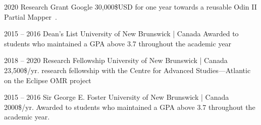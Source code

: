 \documentclass{developercv} %
\begin{document}

\begin{entrylist}

	\entry
	{2020}
	{Research Grant}
	{Google}
	{30,000\$USD for one year towards a reusable Odin II Partial Mapper~\footnotemark.}

	\entry
	{2015 -- 2016}
	{Dean's List}
	{University of New Brunswick | Canada}
	{Awarded to students who maintained a GPA above 3.7 throughout the academic year}

\end{entrylist}



\begin{entrylist}

	\entry
	{2018 -- 2020}
	{Research Fellowship}
	{University of New Brunswick | Canada}
	{23,500\$/yr. research fellowship  with the Centre for Advanced Studies---Atlantic on the Eclipse OMR project}

	\entry
	{2015 -- 2016}
	{Sir George E. Foster}
	{University of New Brunswick | Canada}
	{2000\$/yr. Awarded to students who maintained a GPA above 3.7 throughout the academic year.}

\end{entrylist}

\end{document}
